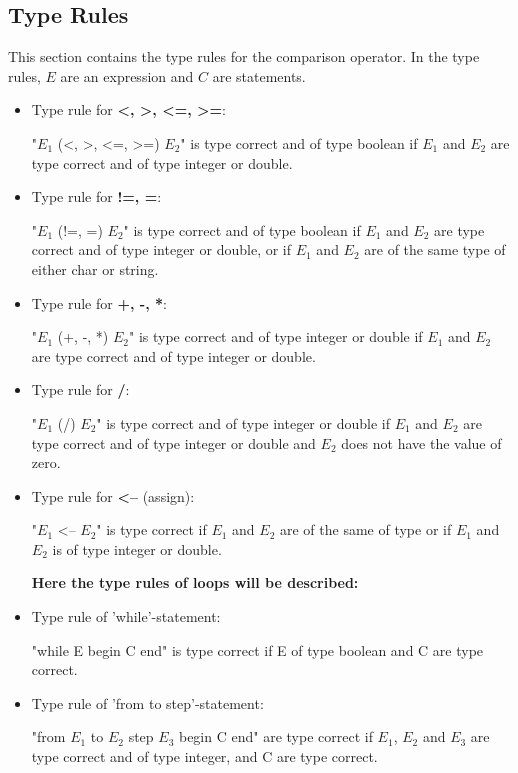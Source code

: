\subsection{Type Rules} %
This section contains the type rules for the comparison operator. In the type rules, $E$ are an expression and $C$ are statements.
\begin{itemize}
\item Type rule for \textbf{<, >, <=, >=}:

"$E_1$ (<, >, <=, >=) $E_2$" is type correct and of type boolean if $E_1$ and $E_2$ are type correct and of type integer or double.

\item Type rule for \textbf{!=, =}:

"$E_1$ (!=, =) $E_2$" is type correct and of type boolean if $E_1$ and $E_2$ are type correct and of type integer or double, or if $E_1$ and $E_2$ are of the same type of either char or string.

\item Type rule for \textbf{+, -, *}:

"$E_1$ (+, -, *) $E_2$" is type correct and of type integer or double if $E_1$ and $E_2$ are type correct and of type integer or double.

\item Type rule for \textbf{/}:

"$E_1$ (/) $E_2$" is type correct and of type integer or double if $E_1$ and $E_2$ are type correct and of type integer or double and $E_2$ does not have the value of zero.

\item Type rule for \textbf{<--} (assign):

"$E_1$ <-- $E_2$" is type correct if $E_1$ and $E_2$ are of the same of type or if $E_1$ and $E_2$ is of type integer or double.

\textbf{Here the type rules of loops will be described:}

\item Type rule of 'while'-statement: 

"while E begin C end" is type correct if E of type boolean and C are type correct.

\item Type rule of 'from to step'-statement: 

"from $E_1$ to $E_2$ step $E_3$ begin C end" are type correct if $E_1$, $E_2$ and $E_3$ are type correct and of type integer, and C are type correct.


\end{itemize}
